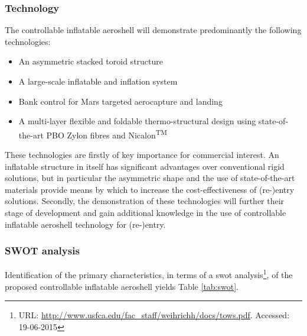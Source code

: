 \subsubsection{Technology}
The controllable inflatable aeroshell will demonstrate predominantly the following technologies:
\begin{itemize}
\item An asymmetric stacked toroid structure
\item A large-scale inflatable and inflation system
\item Bank control for Mars targeted aerocapture and landing
\item A multi-layer flexible and foldable thermo-structural design using state-of-the-art PBO Zylon\textsuperscript{\textregistered} fibres and Nicalon\textsuperscript{TM}
\end{itemize}
These technologies are firstly of key importance for commercial interest. An inflatable structure in itself has significant advantages over conventional rigid solutions, but in particular the asymmetric shape and the use of state-of-the-art materials provide means by which to increase the cost-effectiveness of (re-)entry solutions. Secondly, the demonstration of these technologies will further their stage of development and gain additional knowledge in the use of controllable inflatable aeroshell technology for (re-)entry.


\subsubsection{SWOT analysis}
Identification of the primary characteristics, in terms of a \gls{swot} analysis\footnote{URL: \url{http://www.usfca.edu/fac_staff/weihrichh/docs/tows.pdf}. Accessed: 19-06-2015}, of the proposed controllable inflatable aeroshell yields Table \ref{tab:swot}.

